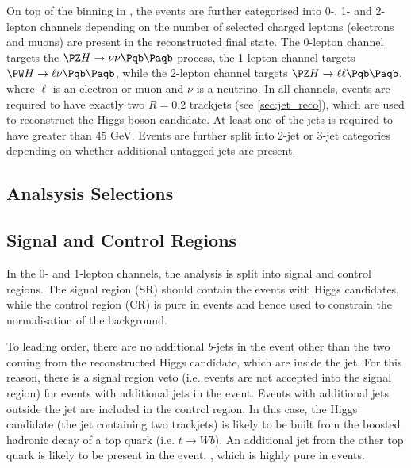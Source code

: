 On top of the binning in \ptv, the events are further categorised into 0-, 1- and 2-lepton channels depending on the number of selected charged leptons (electrons and muons) are present in the reconstructed final state.
The 0-lepton channel targets the $\Zboson \higgs \rightarrow \nu\nu \bbbar$ process, the 1-lepton channel targets $\Wboson \higgs \rightarrow \ell\nu \bbbar$, while the 2-lepton channel targets $\Zboson \higgs \rightarrow \ell\ell \bbbar$, where $\ell$ is an electron or muon and $\nu$ is a neutrino.
In all channels, events are required to have exactly two \btagged $R=0.2$ trackjets (see \cref{sec:jet_reco}), which are used to reconstruct the Higgs boson candidate.
At least one of the \btagged jets is required to have \pT greater than 45 GeV.
Events are further split into 2-jet or 3-jet categories depending on whether additional untagged jets are present. 


\subsection{Analsysis Selections}

%

%

\subsection{Signal and Control Regions}

In the 0- and 1-lepton channels, the analysis is split into signal and control regions.
The signal region (SR) should contain the events with Higgs candidates, while the control region (CR) is pure in \ttbar events and hence used to constrain the normalisation of the \ttbar background.

To leading order, there are no additional $b$-jets in the event other than the two coming from the reconstructed Higgs candidate, which are inside the \largeR jet.
For this reason, there is a signal region veto (i.e. events are not accepted into the signal region) for events with additional \btagged jets in the event.
Events with additional \btagged jets outside the \largeR jet are included in the control region.
In this case, the Higgs candidate (the \largeR jet containing two \btagged trackjets) is likely to be built from the boosted hadronic decay of a top quark (i.e. $t \rightarrow Wb$).
An additional \btagged jet from the other top quark is likely to be present in the event.
, which is highly pure in \ttbar events.


